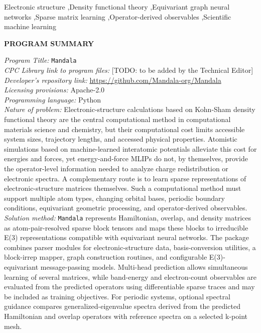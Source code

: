 \documentclass[preprint,12pt,compress,numafflabel]{elsarticle}
\begin{document}
\begin{frontmatter}
\begin{abstract}
\end{abstract}

\begin{keyword}
Electronic structure \sep Density functional theory \sep Equivariant graph neural networks \sep Sparse matrix learning \sep Operator-derived observables \sep Scientific machine learning
\end{keyword}

\end{frontmatter}

{\bf PROGRAM SUMMARY}

\begin{small}
\noindent
{\em Program Title:} \texttt{Mandala} \\
{\em CPC Library link to program files:} [TODO: to be added by the Technical Editor] \\
{\em Developer's repository link:} \url{https://github.com/Mandala-org/Mandala} \\
{\em Licensing provisions:} Apache-2.0 \\
{\em Programming language:} Python \\
{\em Nature of problem:} Electronic-structure calculations based on Kohn-Sham density functional theory are the central computational method in computational materials science and chemistry, but their computational cost limits accessible system sizes, trajectory lengths, and accessed physical properties. Atomistic simulations based on machine-learned interatomic potentials alleviate this cost for energies and forces, yet energy-and-force MLIPs do not, by themselves, provide the operator-level information needed to analyze charge redistribution or electronic spectra. A complementary route is to learn sparse representations of electronic-structure matrices themselves. Such a computational method must support multiple atom types, changing orbital bases, periodic boundary conditions, equivariant geometric processing, and operator-derived observables. \\
{\em Solution method:} \texttt{Mandala} represents Hamiltonian, overlap, and density matrices as atom-pair-resolved sparse block tensors and maps these blocks to irreducible E(3) representations compatible with equivariant neural networks. The package combines parser modules for electronic-structure data, basis-conversion utilities, a block-irrep mapper, graph construction routines, and configurable E(3)-equivariant message-passing models. Multi-head prediction allows simultaneous learning of several matrices, while band-energy and electron-count observables are evaluated from the predicted operators using differentiable sparse traces and may be included as training objectives. For periodic systems, optional spectral guidance compares generalized-eigenvalue spectra derived from the predicted Hamiltonian and overlap operators with reference spectra on a selected k-point mesh.

\end{small}
\end{document}
